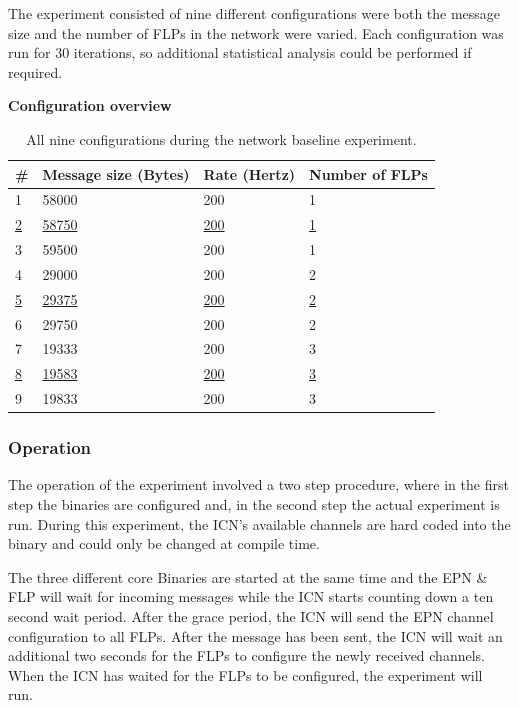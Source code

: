 \documentclass[]{article}
\begin{document}
The experiment consisted of nine different configurations were both the message size and the number of FLPs in the network were varied. Each configuration was run for 30 iterations, so additional statistical analysis could be performed if required.

\begin{table}[H]
	\textbf{Configuration overview}
	\begin{center}
		\begin{tabular}{ | l | l | l | l | }
			\hline
			\textbf{\#} & \textbf{Message size (Bytes)} & \textbf{Rate (Hertz)} & \textbf{Number of FLPs} \\ \hline
			
			1 & 58000 & 200 & 1 \\ \hline
			\underline{2} & \underline{58750} & \underline{200} & \underline{1} \\ \hline
			3 & 59500 & 200 & 1 \\ \hline
			4 & 29000 & 200 & 2 \\ \hline
			\underline{5} & \underline{29375} & \underline{200} & \underline{2} \\ \hline
			6 & 29750 & 200 & 2 \\ \hline
			7 & 19333 & 200 & 3 \\ \hline
			\underline{8} & \underline{19583} & \underline{200} & \underline{3} \\ \hline
			9 & 19833 & 200 & 3 \\ \hline
		\end{tabular}
		\caption{All nine configurations during the network baseline experiment.}
		\label{tab:configoverviewround}
	\end{center}
\end{table}

\subsubsection{Operation}
The operation of the experiment involved a two step procedure, where in the first step the binaries are configured and, in the second step the actual experiment is run. During this experiment, the ICN’s available channels are hard coded into the binary and could only be changed at compile time. 

The three different core Binaries are started at the same time and the EPN \& FLP will wait for incoming messages while the ICN starts counting down a ten second wait period. After the grace period, the ICN will send the EPN channel configuration to all FLPs. After the message has been sent, the ICN will wait an additional two seconds for the FLPs to configure the newly received channels. When the ICN has waited for the FLPs to be configured, the experiment will run.
\end{document}
